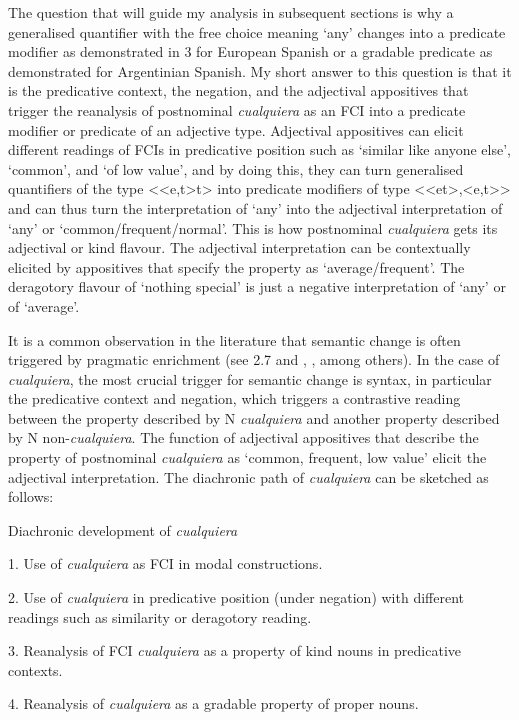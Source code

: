 \documentclass[output=paper]{langscibook}
\begin{document}
  The question that will guide my analysis in subsequent sections is why a generalised quantifier with the free choice meaning ‘any’ changes into a predicate modifier as demonstrated in 3 for European Spanish or a gradable predicate as demonstrated for Argentinian Spanish. My short answer to this question is that it is the predicative context, the negation, and the adjectival appositives that trigger the reanalysis of postnominal \textit{cualquiera} as an FCI into a predicate modifier or predicate of an adjective type. Adjectival appositives can elicit different readings of FCIs in predicative position such as ‘similar like anyone else’, ‘common’, and ‘of low value’, and by doing this, they can turn generalised quantifiers of the type <<e,t>t> into predicate modifiers of type <<et>,<e,t>> and can thus turn the interpretation of ‘any’ into the adjectival interpretation of ‘any’ or ‘common/frequent/normal’. This is how postnominal \textit{cualquiera} gets its adjectival or kind flavour. The adjectival interpretation can be contextually elicited by appositives that specify the property as ‘average/frequent’. The deragotory flavour of ‘nothing special’ is just a negative interpretation of ‘any’ or of ‘average’.

  It is a common observation in the literature that semantic change is often triggered by pragmatic enrichment (see 2.7 and \citealt{TraugottDasher2002}, \citealt{Eckardt2006}, among others). In the case of \textit{cualquiera}, the most crucial trigger for semantic change is syntax, in particular the predicative context and negation, which triggers a contrastive reading between the property described by N \textit{cualquiera} and another property described by N non-\textit{cualquiera}. The function of adjectival appositives that describe the property of postnominal \textit{cualquiera} as ‘common, frequent, low value’ elicit the adjectival interpretation. The diachronic path of \textit{cualquiera} can be sketched as follows:

  Diachronic development of \textit{cualquiera}

  1.  Use of \textit{cualquiera} as FCI in modal constructions.

  2.  Use of \textit{cualquiera} in predicative position (under negation) with different readings such as similarity or deragotory reading.

  3.  Reanalysis of FCI \textit{cualquiera} as a property of kind nouns in predicative contexts.

  4.  Reanalysis of \textit{cualquiera} as a gradable property of proper nouns.
\end{document}
